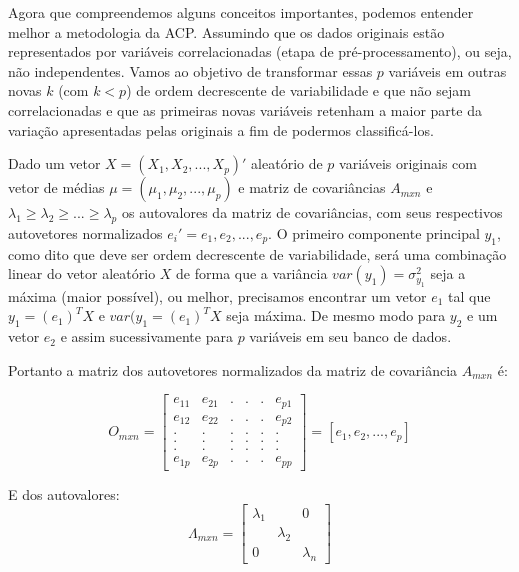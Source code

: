 \documentclass[
  openany]{book}
\begin{document}
Agora que compreendemos alguns conceitos importantes, podemos entender melhor a metodologia da ACP. Assumindo que os dados originais estão representados por variáveis correlacionadas (etapa de pré-processamento), ou seja, não independentes. Vamos ao objetivo de transformar essas \(p\) variáveis em outras novas \(k\) (com \(k<p\)) de ordem decrescente de variabilidade e que não sejam correlacionadas e que as primeiras novas variáveis retenham a maior parte da variação apresentadas pelas originais a fim de podermos classificá-los.

Dado um vetor \(X=(X_1,X_2,..., X_p)'\) aleatório de \(p\) variáveis originais com vetor de médias \(\mu=(\mu_1,\mu_2,...,\mu_p)\) e matriz de covariâncias \(A_{mxn}\) e \(\lambda_1\geq\lambda_2\geq...\geq\lambda_p\) os autovalores da matriz de covariâncias, com seus respectivos autovetores normalizados \(e_i'=e_1,e_2,...,e_p\). O primeiro componente principal \(y_1\), como dito que deve ser ordem decrescente de variabilidade, será uma combinação linear do vetor aleatório \(X\) de forma que a variância \(var(y_1)=\sigma^2_{y_{1}}\) seja a máxima (maior possível), ou melhor, precisamos encontrar um vetor \(e_1\) tal que \(y_1=(e_1)^T X\) e \(var(y_1=(e_1)^T X\) seja máxima. De mesmo modo para \(y_2\) e um vetor \(e_2\) e assim sucessivamente para \(p\) variáveis em seu banco de dados.

Portanto a matriz dos autovetores normalizados da matriz de covariância \(A_{mxn}\) é:

\begin{equation}
    O_{mxn}= 
\begin{bmatrix}
e_{11} &e_{21}  &. &.  &. &e_{p1} \\ 
e_{12} &e_{22}  &. &.  &. &e_{p2} \\ 
.      &.       &. &.  &. &. \\ 
.      &.       &. &.  &. &. \\ 
.      &.       &. &.  &. &. \\ 
e_{1p} &e_{2p}  &. &.  &. &e_{pp} 
\end{bmatrix}
=[e_1,e_2,...,e_p]
\label{eq:autovetormatrix}
\end{equation}

E dos autovalores:
\begin{equation}
\Lambda_{mxn}=
\begin{bmatrix}
\lambda_1 & &0\\
& \lambda_2 & \\
0 & & \lambda_n
\label{eq:autovalormatrix}
\end{bmatrix}
\end{equation}
\end{document}
